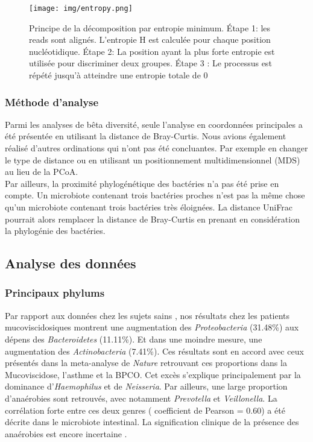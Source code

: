 \documentclass[12pt,a4paper]{article}
\begin{document}
\begin{figure}
\begin{center}
\texttt{[image: img/entropy.png]}\hfill
\end{center}
\caption{Principe de la décomposition par entropie minimum\cite{Bobadilla2015}. Étape 1: les reads sont alignés. L'entropie H est calculée pour chaque position nucléotidique. Étape 2: La position ayant la plus forte entropie est utilisée pour discriminer deux groupes. Étape 3 : Le processus est répété jusqu'à atteindre une entropie totale de 0 }
\label{entropy}
\end{figure}
\subsubsection{Méthode d'analyse}
Parmi les analyses de bêta diversité, seule l'analyse en coordonnées principales a été présentée en utilisant la distance de Bray-Curtis.
Nous avions également réalisé d'autres ordinations qui n'ont pas été concluantes. Par exemple en changer le type de distance ou en utilisant un positionnement multidimensionnel (MDS) au lieu de la PCoA. \\
Par ailleurs, la proximité phylogénétique des bactéries n'a pas été prise en compte. Un microbiote contenant trois bactéries proches n'est pas la même chose qu'un microbiote contenant trois bactéries très éloignées.
La distance UniFrac\cite{Lozupone2005} pourrait alors remplacer la distance de Bray-Curtis en prenant en considération la phylogénie des bactéries.



\subsection{Analyse des données}
\subsubsection{Principaux phylums}
Par rapport aux données chez les sujets sains \cite{Marsland2014}, nos résultats chez les patients mucoviscidosiques montrent une augmentation des \textit{Proteobacteria} (31.48\%) aux dépens des \textit{Bacteroidetes} (11.11\%). Et dans une moindre mesure, une augmentation des \textit{Actinobacteria} (7.41\%). Ces résultats sont en accord avec ceux présentés dans la meta-analyse de \textit{Nature} retrouvant ces proportions dans la Mucoviscidose, l'asthme et la BPCO. Cet excès s’explique principalement par la dominance d’\textit{Haemophilus} et de \textit{Neisseria}.  
Par ailleurs, une large proportion d’anaérobies sont retrouvés, avec notamment   \textit{Prevotella} et \textit{Veillonella}. La corrélation forte entre ces deux genres ( coefficient de Pearson = 0.60) a été décrite dans le microbiote intestinal\cite{Dlugosz2015}. La signification clinique de la  présence des anaérobies est encore incertaine \cite{Tunney2008}.
\end{document}
